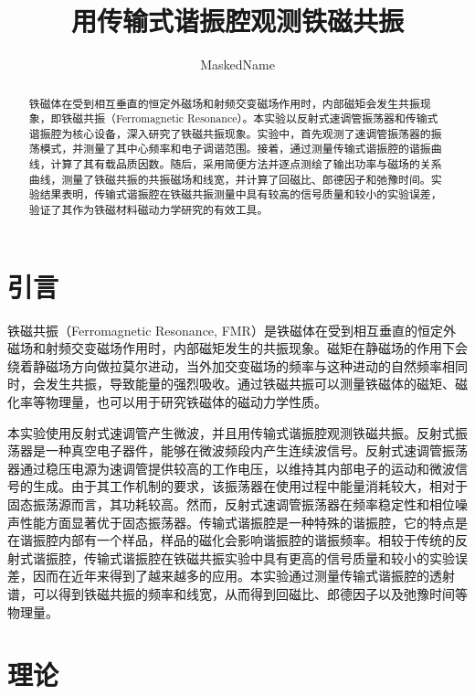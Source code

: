 \documentclass[font=default]{mpltx}
\begin{document}
\title{用传输式谐振腔观测铁磁共振} %
\author{MaskedName} %
\date{}
\begin{abstract}
铁磁体在受到相互垂直的恒定外磁场和射频交变磁场作用时，内部磁矩会发生共振现象，即铁磁共振（Ferromagnetic Resonance）。本实验以反射式速调管振荡器和传输式谐振腔为核心设备，深入研究了铁磁共振现象。实验中，首先观测了速调管振荡器的振荡模式，并测量了其中心频率和电子调谐范围。接着，通过测量传输式谐振腔的谐振曲线，计算了其有载品质因数。随后，采用简便方法并逐点测绘了输出功率与磁场的关系曲线，测量了铁磁共振的共振磁场和线宽，并计算了回磁比、郎德因子和弛豫时间。实验结果表明，传输式谐振腔在铁磁共振测量中具有较高的信号质量和较小的实验误差，验证了其作为铁磁材料磁动力学研究的有效工具。
\end{abstract}
\keywords{}

\maketitle

\section{引言}
铁磁共振（Ferromagnetic Resonance, FMR）是铁磁体在受到相互垂直的恒定外磁场和射频交变磁场作用时，内部磁矩发生的共振现象。磁矩在静磁场的作用下会绕着静磁场方向做拉莫尔进动，当外加交变磁场的频率与这种进动的自然频率相同时，会发生共振，导致能量的强烈吸收。通过铁磁共振可以测量铁磁体的磁矩、磁化率等物理量，也可以用于研究铁磁体的磁动力学性质。

本实验使用反射式速调管产生微波，并且用传输式谐振腔观测铁磁共振。反射式振荡器是一种真空电子器件，能够在微波频段内产生连续波信号。反射式速调管振荡器通过稳压电源为速调管提供较高的工作电压，以维持其内部电子的运动和微波信号的生成。由于其工作机制的要求，该振荡器在使用过程中能量消耗较大，相对于固态振荡源而言，其功耗较高。然而，反射式速调管振荡器在频率稳定性和相位噪声性能方面显著优于固态振荡器。传输式谐振腔是一种特殊的谐振腔，它的特点是在谐振腔内部有一个样品，样品的磁化会影响谐振腔的谐振频率。相较于传统的反射式谐振腔，传输式谐振腔在铁磁共振实验中具有更高的信号质量和较小的实验误差，因而在近年来得到了越来越多的应用。本实验通过测量传输式谐振腔的透射谱，可以得到铁磁共振的频率和线宽，从而得到回磁比、郎德因子以及弛豫时间等物理量。

\section{理论}
\end{document}

